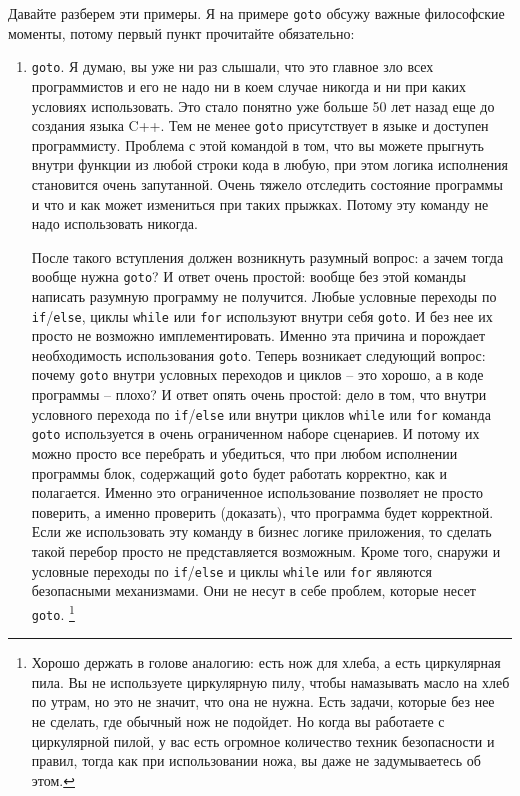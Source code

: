 Давайте разберем эти примеры.
Я на примере \verb"goto" обсужу важные философские моменты, потому первый пункт прочитайте обязательно:
\begin{enumerate}
\item \verb"goto".
Я думаю, вы уже ни раз слышали, что это главное зло всех программистов и его не надо ни в коем случае никогда и ни при каких условиях использовать.
Это стало понятно уже больше 50 лет назад еще до создания языка C++.
Тем не менее \verb"goto" присутствует в языке и доступен программисту.
Проблема с этой командой в том, что вы можете прыгнуть внутри функции из любой строки кода в любую, при этом логика исполнения становится очень запутанной.
Очень тяжело отследить состояние программы и что и как может измениться при таких прыжках.
Потому эту команду не надо использовать никогда.

После такого вступления должен возникнуть разумный вопрос: а зачем тогда вообще нужна \verb"goto"?
И ответ очень простой: вообще без этой команды написать разумную программу не получится.
Любые условные переходы по \verb"if"/\verb"else", циклы \verb"while" или \verb"for" используют внутри себя \verb"goto".
И без нее их просто не возможно имплементировать.
Именно эта причина и порождает необходимость использования \verb"goto".
Теперь возникает следующий вопрос: почему \verb"goto" внутри условных переходов и циклов -- это хорошо, а в коде программы -- плохо?
И ответ опять очень простой: дело в том, что внутри условного перехода по \verb"if"/\verb"else" или внутри циклов \verb"while" или \verb"for" команда \verb"goto" используется в очень ограниченном наборе сценариев.
И потому их можно просто все перебрать и убедиться, что при любом исполнении программы блок, содержащий \verb"goto" будет работать корректно, как и полагается.
Именно это ограниченное использование позволяет не просто поверить, а именно проверить (доказать), что программа будет корректной.
Если же использовать эту команду в бизнес логике приложения, то сделать такой перебор просто не представляется возможным.
Кроме того, снаружи и условные переходы по \verb"if"/\verb"else" и циклы \verb"while" или \verb"for" являются безопасными механизмами.
Они не несут в себе проблем, которые несет \verb"goto".%
\footnote{Хорошо держать в голове аналогию: есть нож для хлеба, а есть циркулярная пила.
Вы не используете циркулярную пилу, чтобы намазывать масло на хлеб по утрам, но это не значит, что она не нужна.
Есть задачи, которые без нее не сделать, где обычный нож не подойдет.
Но когда вы работаете с циркулярной пилой, у вас есть огромное количество техник безопасности и правил, тогда как при использовании ножа, вы даже не задумываетесь об этом.}


\end{enumerate}
